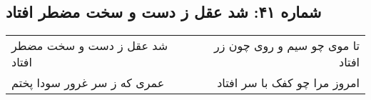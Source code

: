 \begin{center}
\section*{شماره ۴۱: شد عقل ز دست و سخت مضطر افتاد}
\label{sec:041}
\begin{longtable}{l p{0.5cm} r}
شد عقل ز دست و سخت مضطر افتاد
&&
تا موی چو سیم و روی چون زر افتاد
\\
عمری که ز سر غرور سودا پختم
&&
امروز مرا چو کفک با سر افتاد
\\
\end{longtable}
\end{center}
